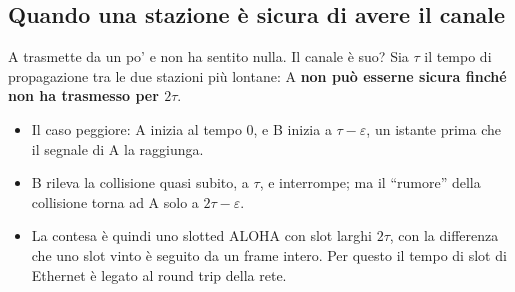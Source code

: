 \subsection{Quando una stazione è sicura di avere il canale}

A trasmette da un po' e non ha sentito nulla. Il canale è suo? Sia $\tau$ il tempo di propagazione tra le due stazioni più lontane:
A \textbf{non può esserne sicura finché non ha trasmesso per $2\tau$}.

\begin{itemize}
    \item Il caso peggiore: A inizia al tempo 0, e B inizia a $\tau - \varepsilon$, un istante prima che il segnale di A la raggiunga.
    \item B rileva la collisione quasi subito, a $\tau$, e interrompe; ma il ``rumore'' della collisione torna ad A solo a
          $2\tau - \varepsilon$.
    \item La contesa è quindi uno slotted ALOHA con slot larghi $2\tau$, con la differenza che uno slot vinto è seguito da un frame
          intero. Per questo il tempo di slot di Ethernet è legato al round trip della rete.
\end{itemize}

